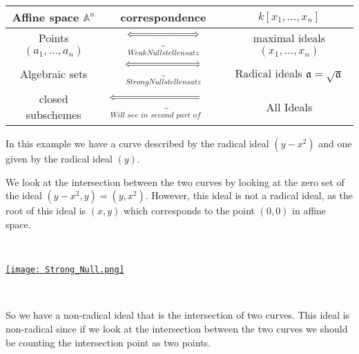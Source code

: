  \begin{tabular}{|c|c|c|}
    \hline
    Affine space $\mathbb{A}^n$& correspondence & $k[x_1,\dots,x_n]$\\
    \hline
    Points $(a_1,\dots,a_n)$ & $\underbrace{\iff}_{Weak Nullstellensatz}$ & maximal ideals $(x_1,\dots,x_n)$ \\
    \hline
    Algebraic sets  & $\underbrace{\iff}_{Strong Nullstellensatz}$  & Radical ideals $\mathfrak{a} = \sqrt{\mathfrak{a}}$\\
    \hline 
    closed subschemes &$\underbrace{\iff}_{\textit{Will see in second part of course}}$ & All Ideals \\
    \hline
\end{tabular}


\begin{example}

    In this example we have a curve described by the radical ideal $(y-x^2)$ and one given by the radical ideal $(y)$.

    We look at the intersection between the two curves by looking at the zero set of the ideal $(y-x^2,y) = (y,x^2)$. However, this ideal is not a radical ideal, as the root of this ideal is $(x,y)$ which corresponds to the point $(0,0)$ in affine space.

    \

    \href{https://youtu.be/1UvW5iTkbLw?t=772}{\texttt{[image: Strong\_Null.png]}}

    \

    So we have a non-radical ideal that is the intersection of two curves. This ideal is non-radical since if we look at the intersection between the two curves we should be counting the intersection point as two points.
\end{example}

